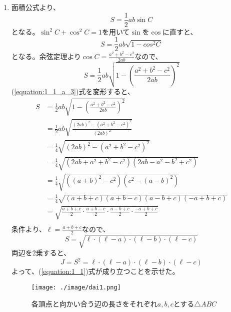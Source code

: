 \begin{enumerate}
  \item 面積公式より、
  \begin{equation}\label{equation:1_1_a_1}
    S = \frac{1}{2} a b \sin{C}
  \end{equation}
  となる。\(\sin^2 C + \cos^2 C = 1\)を用いて\(\sin\)を\(\cos\)に直すと、
  \begin{equation}\label{equation:1_1_a_2}
    S = \frac{1}{2} a b \sqrt{1 - cos^2 C}
  \end{equation}
  となる。余弦定理より\(\cos C = \frac{a^2 + b^2 - c^2}{2ab}\)なので、
  \begin{equation}\label{equation:1_1_a_3}
    S = \frac{1}{2} a b \sqrt{1 - \left(\frac{a^2 + b^2 - c^2}{2ab}\right)^2}
  \end{equation}
  (\ref{equation:1_1_a_3})式を変形すると、
  \begin{equation}\label{equation:1_1_a_4}
    \begin{split}
      S &= \frac{1}{2} a b \sqrt{1 - \left(\frac{a^2 + b^2 - c^2}{2ab}\right)^2}\\
        &= \frac{1}{2} a b \sqrt{\frac{(2ab)^2 - (a^2 + b^2 - c^2)^2}{(2ab)^2}}\\
        &= \frac{1}{4} \sqrt{(2ab)^2 - (a^2 + b^2 - c^2)^2}\\
        &= \frac{1}{4} \sqrt{(2ab + a^2 + b^2 - c^2) (2ab - a^2 - b^2 + c^2)}\\
        &= \frac{1}{4} \sqrt{((a + b)^2 - c^2) (c^2 - (a - b)^2)}\\
        &= \frac{1}{4} \sqrt{(a + b + c)(a + b - c)(a - b + c)(-a + b + c)}\\
        &= \sqrt{\frac{a + b + c}{2}\cdot\frac{a + b - c}{2}\cdot\frac{a - b + c}{2}\cdot\frac{-a + b + c}{2}}\\
    \end{split}
  \end{equation}
  条件より、\(\ell = \frac{a + b + c}{2}\)なので、
  \begin{equation}\label{equation:1_1_a_5}
    S = \sqrt{\ell \cdot \left(\ell - a\right) \cdot \left(\ell - b\right) \cdot \left(\ell - c\right)}
  \end{equation}
  両辺を2乗すると、
  \begin{equation}\label{equation:1_1_a_6}
    J = S^2 = \ell \cdot \left(\ell - a\right) \cdot \left(\ell - b\right) \cdot \left(\ell - c\right)
  \end{equation}
  よって、(\ref{equation:1_1})式が成り立つことを示せた。
  \begin{figure}[htbp]
    \centering
    \texttt{[image: ./image/dai1.png]}
    \caption{各頂点と向かい合う辺の長さをそれぞれ\(a,b,c\)とする\(\bigtriangleup{ABC}\)}
    \label{figure:dai1}
  \end{figure}


\end{enumerate}
